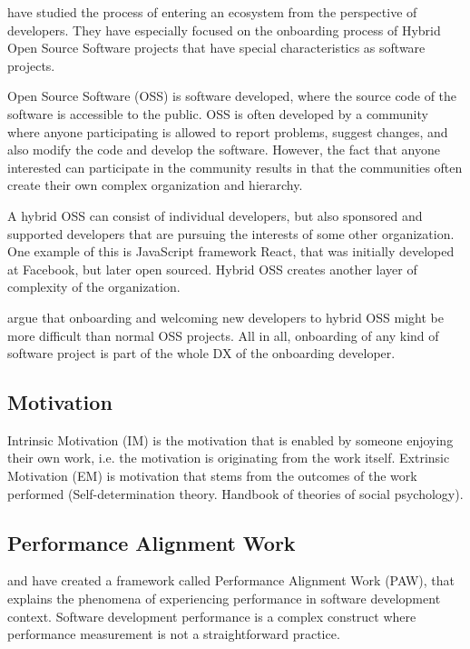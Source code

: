\documentclass[english, 12pt, a4paper, sci, utf8, a-1b, online]{aaltothesis}
\begin{document}
\cite{entering-an-ecosystem} have studied the process of entering an ecosystem from the perspective of developers. They have especially focused on the onboarding process of Hybrid Open Source Software projects that have special characteristics as software projects.

Open Source Software (OSS) is software developed, where the source code of the software is accessible to the public. OSS is often developed by a community where anyone participating is allowed to report problems, suggest changes, and also modify the code and develop the software. However, the fact that anyone interested can participate in the community results in that the communities often create their own complex organization and hierarchy.

A hybrid OSS can consist of individual developers, but also sponsored and supported developers that are pursuing the interests of some other organization. One example of this is JavaScript framework React, that was initially developed at Facebook, but later open sourced. Hybrid OSS creates another layer of complexity of the organization.

\cite{entering-an-ecosystem} argue that onboarding and welcoming new developers to hybrid OSS might be more difficult than normal OSS projects. All in all, onboarding of any kind of software project is part of the whole DX of the onboarding developer.

\subsection{Motivation}

Intrinsic Motivation (IM) is the motivation that is enabled by someone enjoying their own work, i.e. the motivation is originating from the work itself. Extrinsic Motivation (EM) is motivation that stems from the outcomes of the work performed \citep{flow-intrinsic-dx} (Self-determination theory. Handbook of theories of social psychology).

\subsection{Performance Alignment Work}

\cite{how-developers-experience-team-performance} and \cite{paw} have created a framework called Performance Alignment Work (PAW), that explains the phenomena of experiencing performance in software development context. Software development performance is a complex construct where performance measurement is not a straightforward practice.
\end{document}
